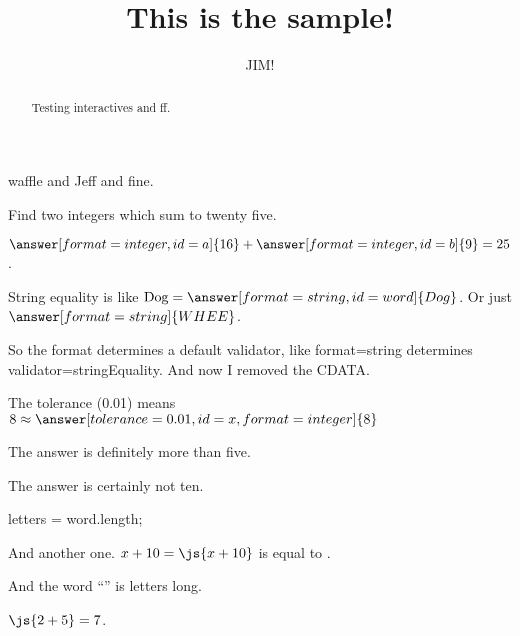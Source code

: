 \documentclass{ximera}
\title{This is the sample!}
\author{JIM!}
\begin{document}
\begin{abstract}
Testing interactives and ff.
\end{abstract}
\maketitle

waffle and Jeff and fine.


\begin{problem}
  \begin{multipleChoice}
  \end{multipleChoice}

  \begin{multipleChoice}[id=mc]
  \end{multipleChoice}
\end{problem}

\begin{problem}
  Find two integers which sum to twenty five.

  \begin{validator}[a+b==25]
    $\answer[format=integer,id=a]{16} + \answer[format=integer,id=b]{9} = 25$.
  \end{validator}
\end{problem}

\begin{problem}
  String equality is like $\mbox{Dog} = \answer[format=string,id=word]{Dog}$.  Or just $\answer[format=string]{WHEE}$.

  So the format determines a default validator, like format=string determines validator=stringEquality.  And now I removed the CDATA.
\end{problem}

\begin{problem}
  The tolerance (0.01) means $8 \approx \answer[tolerance=0.01,id=x,format=integer]{8}$
  
  \begin{feedback}
    The answer is definitely more than five.
  \end{feedback}

  \begin{feedback}[x==10]
    The answer is certainly not ten.
  \end{feedback}
\end{problem}

\begin{javascript}
  letters = word.length;
\end{javascript}

And another one.  $x + 10 = \js{x+10}$ is equal to .

And the word ``'' is  letters long.

$\js{2+5} = 7$.
\end{document}
